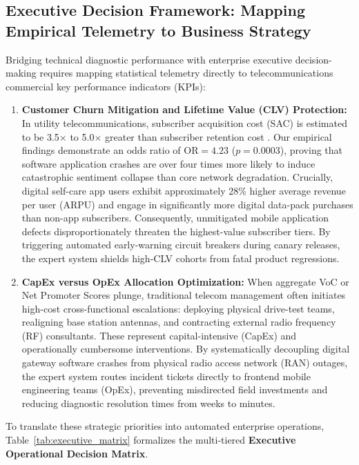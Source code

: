 \documentclass[review,12pt,authoryear]{elsarticle}
\begin{document}
\subsection{Executive Decision Framework: Mapping Empirical Telemetry to Business Strategy}
\label{sec:executive_decision_framework}

Bridging technical diagnostic performance with enterprise executive decision-making requires mapping statistical telemetry directly to telecommunications commercial key performance indicators (KPIs):

\begin{enumerate}
    \item \textbf{Customer Churn Mitigation and Lifetime Value (CLV) Protection:} In utility telecommunications, subscriber acquisition cost (SAC) is estimated to be 3.5$\times$ to 5.0$\times$ greater than subscriber retention cost \citep{reichheld2003one,parasuraman2005esqual}. Our empirical findings demonstrate an odds ratio of $\text{OR} = 4.23$ ($p = 0.0003$), proving that software application crashes are over four times more likely to induce catastrophic sentiment collapse than core network degradation. Crucially, digital self-care app users exhibit approximately 28\% higher average revenue per user (ARPU) and engage in significantly more digital data-pack purchases than non-app subscribers. Consequently, unmitigated mobile application defects disproportionately threaten the highest-value subscriber tiers. By triggering automated early-warning circuit breakers during canary releases, the expert system shields high-CLV cohorts from fatal product regressions.
    
    \item \textbf{CapEx versus OpEx Allocation Optimization:} When aggregate VoC or Net Promoter Scores plunge, traditional telecom management often initiates high-cost cross-functional escalations: deploying physical drive-test teams, realigning base station antennas, and contracting external radio frequency (RF) consultants. These represent capital-intensive (CapEx) and operationally cumbersome interventions. By systematically decoupling digital gateway software crashes from physical radio access network (RAN) outages, the expert system routes incident tickets directly to frontend mobile engineering teams (OpEx), preventing misdirected field investments and reducing diagnostic resolution times from weeks to minutes.
\end{enumerate}

To translate these strategic priorities into automated enterprise operations, Table~\ref{tab:executive_matrix} formalizes the multi-tiered \textbf{Executive Operational Decision Matrix}.
\end{document}
